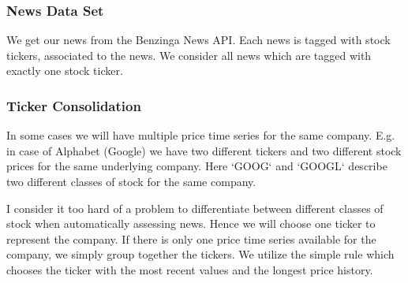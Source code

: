 \documentclass[12pt,a4paper]{article}
\begin{document}

	\subsubsection{News Data Set}
	We get our news from the Benzinga News API.
	Each news is tagged with stock tickers, associated to the news.
	We consider all news which are tagged with exactly one stock ticker.
	
	\subsubsection{Ticker Consolidation}
	In some cases we will have multiple price time series for the same company.
	E.g. in case of Alphabet (Google) we have two different tickers and two different stock prices for the same underlying company. 
	Here `GOOG` and `GOOGL` describe two different classes of stock for the same company.
	
	I consider it too hard of a problem to differentiate between different classes of stock when automatically assessing news.
	Hence we will choose one ticker to represent the company.
	If there is only one price time series available for the company, we simply group together the tickers.
	We utilize the simple rule which chooses the ticker with the most recent values and the longest price history.
	
	
	
	
	
	
	
\end{document}
